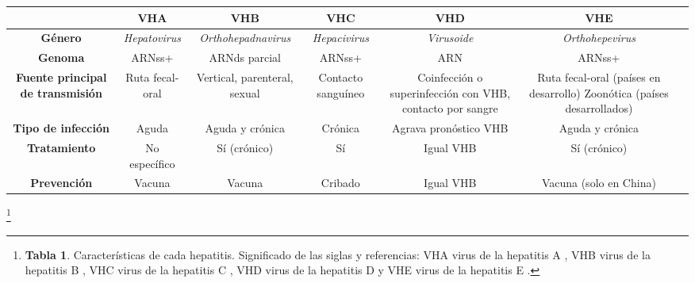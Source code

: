 \documentclass[11 pt]{article}
\begin{document}
\begin{table}[h!]
\begin{tabular}[c]{|c|c|c|c|c|c|c|}
	\hline
    	& {\bf VHA} & {\bf VHB} & {\bf VHC} & {\bf VHD} & {\bf VHE} \\
	\hline
	{\bf Género} & {\em Hepatovirus} & {\em Orthohepadnavirus}&{\em Hepacivirus}&{\em Virusoide}&{\em Orthohepevirus} \\
	\hline
	{\bf Genoma} & ARNss+ & ARNds parcial & ARNss+ & ARN & ARNss+\\
	\hline
	\parbox[c]{2 cm}{{\bf Fuente principal de transmisión}}
 & Ruta fecal-oral & \parbox[c]{2 cm}{Vertical, parenteral, sexual} & \parbox[c]{2 cm}{Contacto sanguíneo} & \parbox[c]{2 cm}{Coinfección o superinfección con VHB, contacto por sangre} & \parbox[c]{2 cm}{Ruta fecal-oral (países en desarrollo) Zoonótica (países desarrollados)}\\
	\hline 
	\parbox[c]{1.75 cm}{{\bf Tipo de infección}} & Aguda & Aguda y crónica & Crónica & \parbox[c]{2 cm}{Agrava pronóstico VHB} & Aguda y crónica\\
	\hline
	{\bf Tratamiento} & No específico & Sí (crónico) & Sí & Igual VHB & Sí (crónico)\\
	\hline
	{\bf Prevención} & Vacuna & Vacuna & Cribado & Igual VHB & \parbox[c]{2 cm}{Vacuna (solo en China)}\\
	\hline
\end{tabular}
\end{table}
\footnote[1]{{\bf Tabla 1}. Características de cada hepatitis. Significado de las siglas y referencias: VHA virus de la hepatitis A \cite{Thuener2017}, VHB virus de la hepatitis B \cite{You2014}, VHC virus de la hepatitis C \cite{Li2015}, VHD virus de la hepatitis D \cite{Rizzetto2015} y VHE virus de la hepatitis E \cite{Mohsen2017}. }
\end{document}
